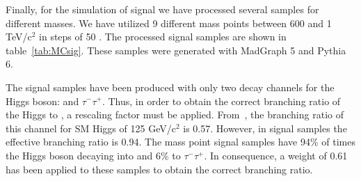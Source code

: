 Finally, for the simulation of signal we have processed several samples for different \Tp masses. We have utilized 9 different mass points between 600 \GeVcc and 1 TeV/$\text{c}^{2}$ in steps of 50 \GeVcc. The processed signal samples are shown in table~\ref{tab:MCsig}. These samples were generated with MadGraph 5 and Pythia 6.

\begin{table*}[htbH]
\begin{center}
\caption{List of Monte-Carlo signal samples used in the analysis, their corresponding cross-section and \Tp mass.\label{tab:MCsig}}
\end{center}
\end{table*}

The signal samples have been produced with only two decay channels for the Higgs boson: \bbbar and $\tau^{-}\tau^{+}$. Thus, in order to obtain the correct branching ratio of the Higgs to \bbbar, a rescaling factor must be applied. From~\cite{Heinemeyer:2013tqa}, the branching ratio of this channel for SM Higgs of 125 GeV/$\text{c}^{2}$ is 0.57. However, in signal samples the effective branching ratio is 0.94. The mass point signal samples have 94\% of times the Higgs boson decaying into \bbbar and 6\% to $\tau^{-}\tau^{+}$. In consequence, a weight of 0.61 has been applied to these samples to obtain the correct branching ratio. %

